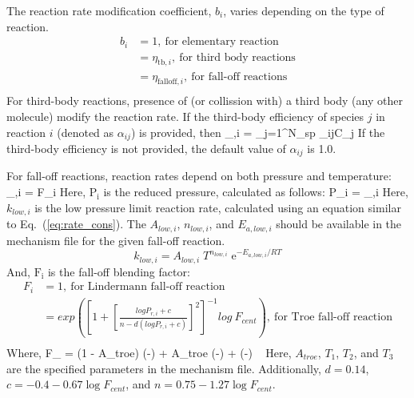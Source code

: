 The reaction rate modification coefficient, $b_i$, varies depending on the type of reaction.
\begin{equation}\label{eq:reac_mod_coeff}
\begin{aligned}
b_i &= 1, \ \text{for elementary reaction} \\
    &= \eta_{\mathrm{tb},i}, \ \text{for third body reactions} \\
    &= \eta_{\mathrm{falloff},i}, \ \text{for fall-off reactions} \\
\end{aligned}
\end{equation}
For third-body reactions, presence of (or collission with) a third body (any other molecule) modify the reaction rate. If the third-body efficiency of species $j$ in reaction $i$ (denoted as $\alpha_{ij}$) is provided, then
\be
\eta_{,i} = \sum_{j=1}^{N_{sp}} \alpha_{ij}C_{j}
\ee
If the third-body efficiency is not provided, the default value of $\alpha_{ij}$ is 1.0.

For fall-off reactions, reaction rates depend on both pressure and temperature:
\be
\eta_{,i} =   F_i
\ee
Here, $\mathrm{P_{i}}$ is the reduced pressure, calculated as follows:
\be
P_{i} =   \eta_{,i}
\ee
Here, $k_{low,i}$ is the low pressure limit reaction rate, calculated using an equation similar to Eq.~(\ref{eq:rate_cons}). The $A_{low,i}$, $n_{low,i}$, and $E_{a,low,i}$ should be available in the mechanism file for the given fall-off reaction.
\begin{equation}\label{eq:low_rate_cons}
k_{low,i} = A_{low,i}\;T^{n_{low,i}}\;\mathrm{e}^{-E_{a,low,i}/RT}
\end{equation}
And, $\mathrm{F_{i}}$ is the fall-off blending factor:
\begin{equation}\label{eq:falloff_Fi}
\begin{aligned}
F_i &= 1, \ \text{for Lindermann fall-off reaction} \\
    &= exp\left( {\left[1+ {\left[\frac{log P_{r,i} + c}{n-d(log P_{r,i} + c)} \right]}^2 \right]^{-1} {log \ F_{cent} }} \right) , \ \text{for Troe fall-off reaction} \\
\end{aligned}
\end{equation}
Where, 
\be
F_{} = (1 - A_{troe}) \exp\left(-\right) + A_{troe} \exp\left(-\right) + \exp\left(-\right) \
\ee
Here, $A_{troe}$, $T_1$, $T_2$, and $T_3$ are the specified parameters in the mechanism file. Additionally, $d=0.14$, $c=-0.4 - 0.67 \log F_{cent}$, and $n=0.75 - 1.27\log F_{cent}$.

